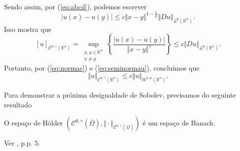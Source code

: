 \documentclass[a4paper, 11pt]{book}
\theoremstyle{definition}
\newcommand{\bR}{\mathbb{R}}
\newcommand{\cC}{\mathcal{C}}
\newcommand{\cL}{\mathcal{L}}
\newcommand{\cW}{\mathcal{W}}
\begin{document}
\begin{prf}
    Sendo assim, por (\ref{eq:abcd}), podemos escrever
    \[
        |u(x) - u(y)| \leqslant c \Vert x - y \Vert^{1 - \frac{n}{p}} \Vert Du \Vert_{\cL^p(\bR^n)}.
    \]
    Isso mostra que
    \begin{equation} \label{eq:seminormau}
        [u]_{\cC^{0,\gamma}(\bR^n)} = \sup_{\substack{x,y \in \bR^n\\x \neq y}} \left\{ \frac{|u(x) - u(y)|}{\Vert x - y \Vert^{\gamma}} \right\} \leqslant c \Vert Du \Vert_{\cL^p(\bR^n)}.
    \end{equation}
    Portanto, por (\ref{eq:normac}) e (\ref{eq:seminormau}), concluímos que
    \[
        \Vert u \Vert_{\cC^{0,\gamma}(\bR^n)} \leqslant c \Vert u \Vert_{\cW^{1,p}(\bR^n)}.
    \]
\end{prf}

Para demonstrar a próxima desigualdade de Sobolev, precisamos do seguinte resultado

\begin{tbox} \label{thm:holder-completo}
    O espaço de Hölder $(\cC^{0,\gamma}(\overline\Omega), \Vert \cdot \Vert_{\cC^{0,\gamma}(\overline\Omega)})$ é um espaço de Banach.
\end{tbox}
\begin{prf}
    Ver \cite{irina-holder.spaces}, p.p. 5.
\end{prf}
\end{document}
